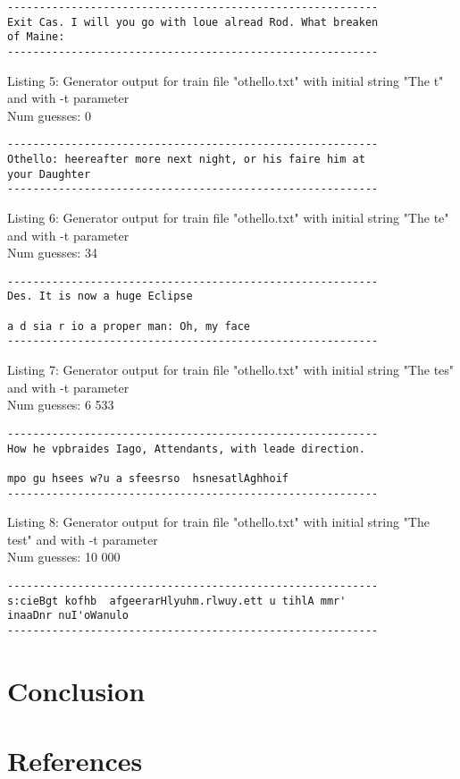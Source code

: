 \documentclass{article}
\begin{document}
\begin{lstlisting}
----------------------------------------------------------
Exit Cas. I will you go with loue alread Rod. What breaken 
of Maine:
----------------------------------------------------------
\end{lstlisting}

Listing 5: Generator output for train file "othello.txt" with initial string "The t" and with -t parameter
\\Num guesses: 0

\begin{lstlisting}
----------------------------------------------------------
Othello: heereafter more next night, or his faire him at 
your Daughter
----------------------------------------------------------
\end{lstlisting}

Listing 6: Generator output for train file "othello.txt" with initial string "The te" and with -t parameter
\\Num guesses: 34

\begin{lstlisting}
----------------------------------------------------------
Des. It is now a huge Eclipse

a d sia r io a proper man: Oh, my face 
----------------------------------------------------------
\end{lstlisting}

Listing 7: Generator output for train file "othello.txt" with initial string "The tes" and with -t parameter
\\Num guesses: 6 533

\begin{lstlisting}
----------------------------------------------------------
How he vpbraides Iago, Attendants, with leade direction.

mpo gu hsees w?u a sfeesrso  hsnesatlAghhoif
----------------------------------------------------------
\end{lstlisting}

Listing 8: Generator output for train file "othello.txt" with initial string "The test" and with -t parameter
\\Num guesses: 10 000

\begin{lstlisting}
----------------------------------------------------------
s:cieBgt kofhb  afgeerarHlyuhm.rlwuy.ett u tihlA mmr'
inaaDnr nuI'oWanulo
----------------------------------------------------------
\end{lstlisting}

    
    

\section{Conclusion}
\label{sec:conclusion}


\section{References}


\end{document}

